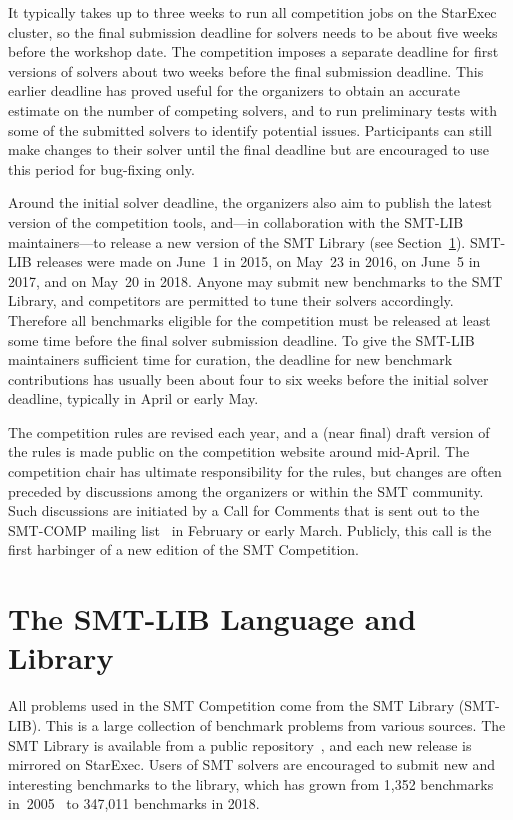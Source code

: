 \documentclass[dvipsnames,table,twoside,11pt]{article}
\begin{document}
It typically takes up to three weeks to run all competition jobs on
the StarExec cluster, so the final submission deadline for solvers
needs to be about five weeks before the workshop date.  The
competition imposes a separate deadline for first versions of solvers
about two weeks before the final submission deadline.  This earlier
deadline has proved useful for the organizers to obtain an accurate
estimate on the number of competing solvers, and to run preliminary
tests with some of the submitted solvers to identify potential issues.
Participants can still make changes to their solver until the final
deadline but are encouraged to use this period for bug-fixing only.

Around the initial solver deadline, the organizers also aim to publish
the latest version of the competition tools, and---in collaboration
with the SMT-LIB maintainers---to release a new version of the SMT
Library (see Section~\ref{sec:smtlib}).  SMT-LIB releases were made on
June~1 in 2015, on May~23 in 2016, on June~5 in 2017, and on May~20 in
2018.  Anyone may submit new benchmarks to the SMT Library, and
competitors are permitted to tune their solvers accordingly.
Therefore all benchmarks eligible for the competition must be released
at least some time before the final solver submission deadline.  To
give the SMT-LIB maintainers sufficient time for curation, the
deadline for new benchmark contributions has usually been about four
to six weeks before the initial solver deadline, typically in April or
early May.

The competition rules are revised each year, and a (near final) draft
version of the rules is made public on the competition website around
mid-April.  The competition chair has ultimate responsibility for the
rules, but changes are often preceded by discussions among the
organizers or within the SMT community.  Such discussions are
initiated by a Call for Comments that is sent out to the SMT-COMP
mailing list~\cite{smtcomp-mailinglist} in February or early March.
Publicly, this call is the first harbinger of a new edition of the SMT
Competition.


\section{The SMT-LIB Language and Library}
\label{sec:smtlib}

All problems used in the SMT Competition come from the SMT Library
(SMT-LIB).  This is a large collection of benchmark problems from
various sources.  The SMT Library is available from a public
repository~\cite{smtlib-repository}, and each new release is mirrored
on StarExec.  Users of SMT solvers are encouraged to submit new and
interesting benchmarks to the library, which has grown from 1,352
benchmarks in~2005~\cite{BdMS05} to 347,011 benchmarks in 2018.
\end{document}
